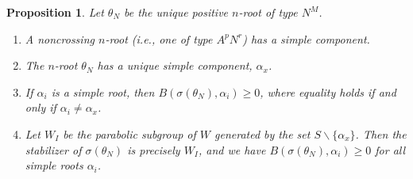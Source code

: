 \documentclass[11pt]{amsart}
\theoremstyle{plain}
\newtheorem{prop}[theorem]{Proposition}
\theoremstyle{definition}
\theoremstyle{remark}
\numberwithin{equation}{subsection}
\newcommand{\al}{\alpha}
\begin{document}
\begin{prop}\label{prop:ancomp}
    Let $\theta_N$ be the unique positive $n$-root of type $N^M$.
    \begin{enumerate}
        \item[{\rm (i)}]{A noncrossing $n$-root (i.e., one of type $A^pN^r$) has
     a simple component.}
 \item[{\rm (ii)}]{The $n$-root $\theta_N$ has a unique simple component,
     $\al_x$.}
 \item [{\rm (iii)}] If $\al_i$ is a simple root, then
     $B(\sigma(\theta_N),\al_i)\ge 0$, where equality holds if and only if
     $\al_i\neq\al_x$.
 \item[{\rm (iv)}] Let $W_I$ be the parabolic subgroup of $W$ generated by the
     set $S \backslash \{\al_x\}$. Then the stabilizer of $\sigma(\theta_N)$ is
     precisely $W_I$, and we have $B(\sigma(\theta_N), \al_i) \geq 0$ for all
     simple roots $\al_i$.
\end{enumerate}
\end{prop}
\end{document}
